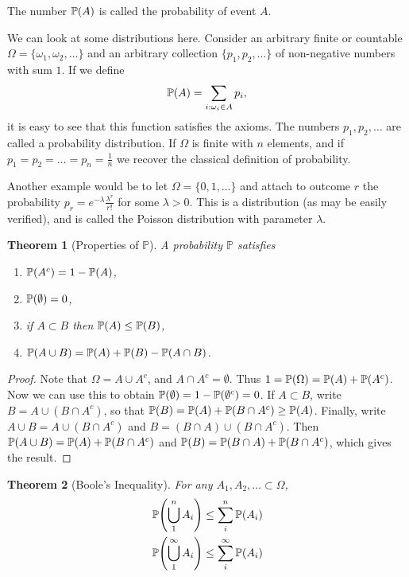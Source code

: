 \documentclass{notes}
\theoremstyle{plain}
\newtheorem{theorem}{Theorem}[chapter]
\newcommand{\bP}{\mathbb{P}}
\newcommand{\prob}[1]{\bP \negthinspace\left(#1\right)}
\begin{document}
The number $\prob{A}$ is called the probability of event $A$.

We can look at some distributions here.  Consider an arbitrary finite or
countable $\Omega = \{ \omega_1, \omega_2, \dots \}$ and an arbitrary
collection $\{ p_1, p_2, \dots \}$ of non-negative numbers with sum $1$.
If we define
\[
\prob{A} = \sum_{i : \omega_i \in A} p_i,
\]
it is easy to see that this function satisfies the axioms.  The numbers
$p_1, p_2, \dots$ are called a probability distribution.  If $\Omega$ is finite
with $n$ elements, and if $p_1 = p_2 = \dots = p_n = \tfrac{1}{n}$ we recover
the classical definition of probability.

Another example would be to let $\Omega = \{ 0, 1, \dots \}$ and attach
to outcome $r$ the probability $p_r = e^{-\lambda} \tfrac{\lambda^r}{r!}$
for some $\lambda > 0$.  This is a distribution (as may be easily verified),
and is called the Poisson distribution with parameter $\lambda$.

\begin{theorem}[Properties of $\bP$]
A probability $\bP$ satisfies
\begin{enumerate}
\item $\prob{A^c} = 1 - \prob{A}$,
\item $\prob{\emptyset} = 0$,
\item if $A \subset B$ then $\prob{A} \le \prob{B}$,
\item $\prob{A \cup B} = \prob{A} + \prob{B} - \prob{A \cap B}$.
\end{enumerate}
\end{theorem}

\begin{proof}
Note that $\Omega = A \cup A^c$, and $A \cap A^c = \emptyset$.  Thus
$1 = \prob{\Omega} = \prob{A} + \prob{A^c}$.  Now we can use this to obtain
$\prob{\emptyset} = 1 - \prob{\emptyset^c} = 0$.  If $A \subset B$, write
$B = A \cup ( B \cap A^c )$, so that $\prob{B} = \prob{A} + \prob{B \cap A^c}
\ge \prob{A}$.  Finally, write $A \cup B = A \cup (B \cap A^c)$ and
$B = (B \cap A) \cup (B \cap A^c)$.  Then $\prob{A \cup B}
= \prob{A} + \prob{B \cap A^c}$ and $\prob{B} = \prob{B \cap A}
+ \prob{B \cap A^c}$, which gives the result.
\end{proof}

\begin{theorem}[Boole's Inequality]
For any $A_1, A_2, \dots \subset \Omega$,
\begin{gather*}
\prob{\bigcup_1^n A_i} \le \sum_i^n \prob{A_i} \\
\prob{\bigcup_1^\infty A_i} \le \sum_i^\infty \prob{A_i}
\end{gather*}
\end{theorem}
\end{document}
